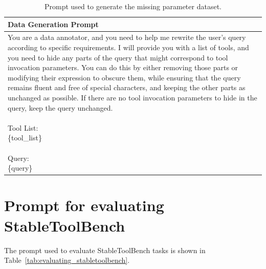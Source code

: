 \begin{table}[ht!]
    \centering
    \caption{Prompt used to generate the missing parameter dataset.}
    \begin{tabular}{l}
    \toprule
    \rowcolor[gray]{0.95} 
    \textbf{Data Generation Prompt} \\
    \midrule
    \makecell[l{p{\textwidth}}]{
You are a data annotator, and you need to help me rewrite the user's query according to specific requirements. I will provide you with a list of tools, and you need to hide any parts of the query that might correspond to tool invocation parameters. You can do this by either removing those parts or modifying their expression to obscure them, while ensuring that the query remains fluent and free of special characters, and keeping the other parts as unchanged as possible. If there are no tool invocation parameters to hide in the query, keep the query unchanged.\\
\\
Tool List:\\
\{tool\_list\}\\
\\
Query:\\
\{query\}\\
}
    \\
    \bottomrule
    \end{tabular}
    \label{tab:prompt_data_generation}
\end{table}



\section{Prompt for evaluating StableToolBench}
\label{sec:evaluating_stabletoolbench}
The prompt used to evaluate StableToolBench tasks is shown in Table~\ref{tab:evaluating_stabletoolbench}.

